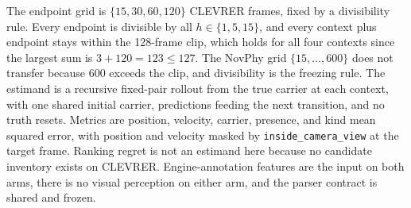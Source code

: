The endpoint grid is $\{15, 30, 60, 120\}$ CLEVRER frames, fixed by a divisibility rule. Every endpoint is divisible by all $h \in \{1,5,15\}$, and every context plus endpoint stays within the 128-frame clip, which holds for all four contexts since the largest sum is $3 + 120 = 123 \le 127$. The NovPhy grid $\{15, \ldots, 600\}$ does not transfer because 600 exceeds the clip, and divisibility is the freezing rule. The estimand is a recursive fixed-pair rollout from the true carrier at each context, with one shared initial carrier, predictions feeding the next transition, and no truth resets. Metrics are position, velocity, carrier, presence, and kind mean squared error, with position and velocity masked by \texttt{inside\_camera\_view} at the target frame. Ranking regret is not an estimand here because no candidate inventory exists on CLEVRER. Engine-annotation features are the input on both arms, there is no visual perception on either arm, and the parser contract is shared and frozen.

